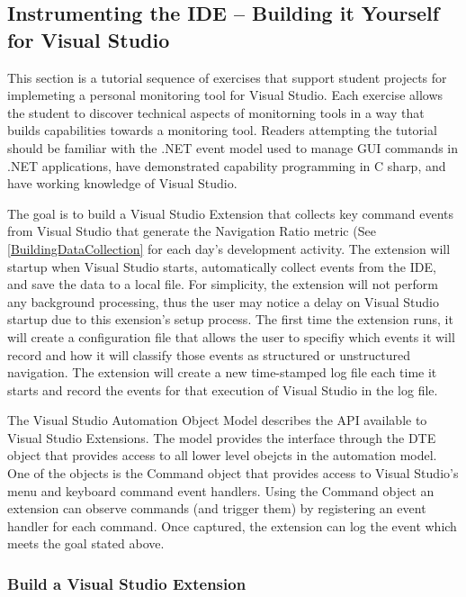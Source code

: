 
\subsection{Instrumenting the IDE -- Building it Yourself for Visual Studio} 
\label{buildItYourself}

This section is a tutorial sequence of exercises that support student projects for implemeting a personal monitoring tool for Visual Studio.  Each exercise allows the student to discover technical aspects of monitorning tools in a way that builds capabilities towards a monitoring tool.  Readers attempting the tutorial should be familiar with the .NET event model used to manage GUI commands in .NET applications, have demonstrated capability programming in C sharp, and have working knowledge of Visual Studio.  

The goal is to build a Visual Studio Extension that collects key command events from Visual Studio that generate the Navigation Ratio metric (See \ref{BuildingDataCollection} for each day's development activity.  The extension will startup when Visual Studio starts, automatically collect events from the IDE, and save the data to a local file.  For simplicity, the extension will not perform any background processing, thus the user may notice a delay on Visual Studio startup due to this exension's setup process.  The first time the extension runs, it will create a configuration file that allows the user to specifiy which events it will record and how it will classify those events as structured or unstructured navigation.  The extension will create a new time-stamped log file each time it starts and record the events for that execution of Visual Studio in the log file. 

The Visual Studio Automation Object Model describes the API available to Visual Studio Extensions.  The model provides the interface through the DTE object that provides access to all lower level obejcts in the automation model.  One of the objects is the Command object that provides access to Visual Studio's menu and keyboard command event handlers.  Using the Command object an extension can observe commands (and trigger them) by registering an event handler for each command.  Once captured, the extension can log the event which meets the goal stated above.

\subsubsection{Build a Visual Studio Extension}

